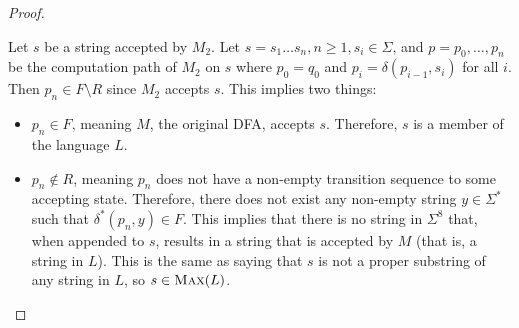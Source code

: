 \begin{problem}
\begin{Answer}
\begin{enumalph}
\begin{claim}
\begin{proof}
\begin{enumroman}
            
            \step
            Let $s$ be a string accepted by $M_2$.
            Let $s = s_1 \ldots s_n, n \ge 1, s_i \in \Sigma$,
            and $p = p_0, \ldots, p_n$ be the computation path of $M_2$ on $s$
            where $p_0 = q_0$ and $p_i = \delta(p_{i-1}, s_i)$ for all $i$.
            Then $p_n \in F \setminus R$ since $M_2$ accepts $s$.
            This implies two things:
            \begin{itemize}
              \item $p_n \in F$, meaning $M$, the original DFA, accepts $s$.
                Therefore, $s$ is a member of the language $L$.
              \item $p_n \notin R$, meaning $p_n$ does not have a non-empty transition sequence to some accepting state.
                Therefore, there does not exist any non-empty string $y \in \Sigma^*$
                such that $\delta^*(p_n, y) \in F$.
                This implies that there is no string in $\Sigma^8$ that, when appended to $s$,
                results in a string that is accepted by $M$ (that is, a string in $L$).
                This is the same as saying that $s$ is not a proper substring of any string in $L$,
                so $s \in \textsc{Max}(L)$.
            \end{itemize}
          \end{enumroman}
        \end{proof}
      \end{claim}
    \end{enumalph}
  \end{Answer}
\end{problem}
